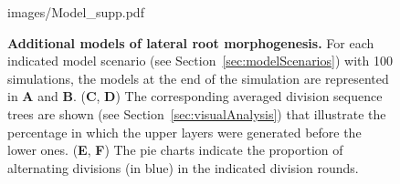 \documentclass[11pt,a4paper, final]{article}
\newcommand{\TODO}[1]{
\textcolor{red}{TODO:#1}
}
\begin{document}
\begin{figure}[htbp]
\centering
	\begin{overpic}[width=1.0\linewidth]{images/Model_supp.pdf}
	\end{overpic}
\caption[Additional models of lateral root morphogenesis.]
{{\bf Additional models of lateral root morphogenesis.} For each indicated model scenario (see Section~\ref{sec:modelScenarios}) with 100 simulations, the models at the end of the simulation are represented in \textbf{A} and \textbf{B}. (\textbf{C}, \textbf{D}) The corresponding averaged division sequence trees are shown (see Section~\ref{sec:visualAnalysis}) that illustrate the percentage in which the upper layers were generated before the lower ones. (\textbf{E}, \textbf{F}) The pie charts indicate the proportion of alternating divisions (in blue) in the indicated division rounds.
}
\label{fig:Modelsupp}
\end{figure}
%

%
%
\end{document}
